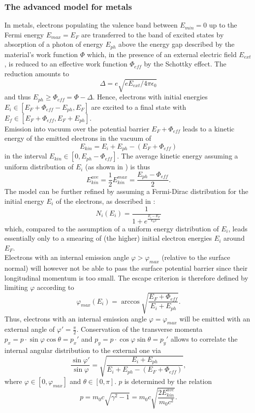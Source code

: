 \documentclass{psi-note}    %
\begin{document}
\subsubsection{The advanced model for metals}
In metals, electrons populating the valence band between $E_{min}=0$ up to the
Fermi energy $E_{max}=E_F$ are transferred to the band of excited states by
absorption of a photon of energy $E_{ph}$ above the energy gap described by the
material's work function $\Phi$ which, in the presence of an external electric
field $E_{ext}$, is reduced to an effective work function $\Phi_{eff}$ by the
Schottky effect. The reduction amounts to
%
$$\Delta = e \sqrt{e E_{ext} / 4 \pi \epsilon_0}$$
%
and thus $E_{ph} \geq \Phi_{eff} = \Phi - \Delta$. Hence, electrons with initial
energies $E_i \in [E_F + \Phi_{eff} - E_{ph}, E_F]$ are excited to a final state
with $E_f \in [E_F + \Phi_{eff}, E_F + E_{ph}]$. \\
Emission into vacuum over the potential barrier $E_F + \Phi_{eff}$ leads to a
kinetic energy of the emitted electrons in the vacuum of 
%
$$E_{kin} = E_i + E_{ph} - (E_F + \Phi_{eff})$$
%
in the interval $E_{kin} \in [0,E_{ph} - \Phi_{eff}]$. The average kinetic
energy assuming a uniform distribution of $E_i$ (as shown in \cite{ANGHEL}) is
thus
%
$$E_{kin}^{ave} = \frac{1}{2} E_{kin}^{max} = \frac{E_{ph} - \Phi_{eff}}{2} .$$
%
The model can be further refined by assuming a Fermi-Dirac distribution for the
initial energy $E_i$ of the electrons, as described in \cite{DAVE}: $$N_i(E_i) =
\frac{1}{1 + e^{\frac{E_i - E_F}{k_B T}}}$$ which, compared to the assumption of
a uniform energy distribution of $E_i$, leads essentially only to a smearing of
(the higher) initial electron energies $E_i$ around $E_F$.\\
Electrons with an internal emission angle $\varphi > \varphi_{max}$ (relative
to the surface normal) will however not be able to pass the surface potential
barrier since their longitudinal momentum is too small. The escape criterion is
therefore defined by limiting $\varphi$ according to 
%
$$\varphi_{max} (E_i) = \arccos \sqrt{\frac{E_F +\Phi_{eff}}{E_i + E_{ph}}} .$$
%
Thus, electrons with an internal emission angle $\varphi = \varphi_{max}$ will
be emitted with an external angle of $\varphi ' = \frac{\pi}{2}$. Conservation
of the transverse momenta $p_x = p \cdot \sin \varphi \cos \theta = p_x '$ and
$p_y = p \cdot \cos \varphi \sin \theta = p_y '$ allows to correlate the
internal angular distribution to the external one via 
%
$$\frac{\sin\varphi '}{\sin \varphi} = \sqrt{\frac{E_i + E_{ph}}{E_i + E_{ph} - (E_F + \Phi_{eff})}} ,$$
%
where $\varphi \in [0, \varphi_{max}]$ and $\theta \in [0, \pi]$. 
$p$ is determined by the relation
%
$$p= m_0 c \sqrt{\gamma^2 - 1} = m_0 c\sqrt{\frac{2 E_{kin}^{ave}}{m_0 c^2}} .$$ 
\end{document}
